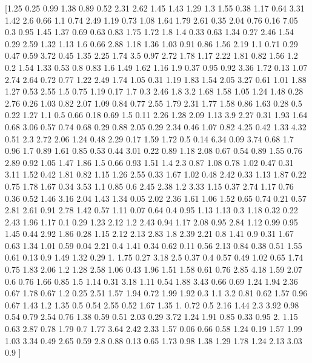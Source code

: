 \documentclass[preview]{standalone}
\begin{document}
\begin{center}
[1.25 0.25 0.99 1.38 0.89 0.52 2.31 2.62 1.45 1.43 1.29 1.3  1.55 0.38
 1.17 0.64 3.31 1.42 2.6  0.66 1.1  0.74 2.49 1.19 0.73 1.08 1.64 1.79
 2.61 0.35 2.04 0.76 0.16 7.05 0.3  0.95 1.45 1.37 0.69 0.63 0.83 1.75
 1.72 1.8  1.4  0.33 0.63 1.34 0.27 2.46 1.54 0.29 2.59 1.32 1.13 1.6
 0.66 2.88 1.18 1.36 1.03 0.91 0.86 1.56 2.19 1.1  0.71 0.29 0.47 0.59
 3.72 0.45 1.35 2.25 1.74 3.5  0.97 2.72 1.78 1.17 2.22 1.81 0.82 1.56
 1.2  0.2  1.54 1.33 0.53 0.8  0.83 1.6  1.49 1.62 1.16 1.9  0.37 0.95
 0.92 3.36 1.72 0.13 1.07 2.74 2.64 0.72 0.77 1.22 2.49 1.74 1.05 0.31
 1.19 1.83 1.54 2.05 3.27 0.61 1.01 1.88 1.27 0.53 2.55 1.5  0.75 1.19
 0.17 1.7  0.3  2.46 1.8  3.2  1.68 1.58 1.05 1.24 1.48 0.28 2.76 0.26
 1.03 0.82 2.07 1.09 0.84 0.77 2.55 1.79 2.31 1.77 1.58 0.86 1.63 0.28
 0.5  0.22 1.27 1.1  0.5  0.66 0.18 0.69 1.5  0.11 2.26 1.28 2.09 1.13
 3.9  2.27 0.31 1.93 1.64 0.68 3.06 0.57 0.74 0.68 0.29 0.88 2.05 0.29
 2.34 0.46 1.07 0.82 4.25 0.42 1.33 4.32 0.51 2.3  2.72 2.06 1.24 0.48
 2.29 0.17 1.59 1.72 0.5  0.14 6.34 0.09 3.74 0.68 1.7  0.96 1.7  0.89
 1.61 0.85 0.53 0.44 3.01 0.22 0.89 1.18 2.08 0.67 0.54 0.89 1.55 0.76
 2.89 0.92 1.05 1.47 1.86 1.5  0.66 0.93 1.51 1.4  2.3  0.87 1.08 0.78
 1.02 0.47 0.31 3.11 1.52 0.42 1.81 0.82 1.15 1.26 2.55 0.33 1.67 1.02
 0.48 2.42 0.33 1.13 1.87 0.22 0.75 1.78 1.67 0.34 3.53 1.1  0.85 0.6
 2.45 2.38 1.2  3.33 1.15 0.37 2.74 1.17 0.76 0.36 0.52 1.46 3.16 2.04
 1.43 1.34 0.05 2.02 2.36 1.61 1.06 1.52 0.65 0.74 0.21 0.57 2.81 2.61
 0.91 2.78 1.42 0.57 1.11 0.07 0.64 0.4  0.95 1.13 1.13 0.3  1.18 0.32
 0.22 2.43 1.96 1.17 0.1  0.29 1.23 2.12 1.2  2.43 0.94 1.17 2.08 0.95
 2.84 1.12 0.99 0.95 1.45 0.44 2.92 1.86 0.28 1.15 2.12 2.13 2.83 1.8
 2.39 2.21 0.8  1.41 0.9  0.31 1.67 0.63 1.34 1.01 0.59 0.04 2.21 0.4
 1.41 0.34 0.62 0.11 0.56 2.13 0.84 0.38 0.51 1.55 0.61 0.13 0.9  1.49
 1.32 0.29 1.   1.75 0.27 3.18 2.5  0.37 0.4  0.57 0.49 1.02 0.65 1.74
 0.75 1.83 2.06 1.2  1.28 2.58 1.06 0.43 1.96 1.51 1.58 0.61 0.76 2.85
 4.18 1.59 2.07 0.6  0.76 1.66 0.85 1.5  1.14 0.31 3.18 1.11 0.54 1.88
 3.43 0.66 0.69 1.24 1.94 2.36 0.67 1.78 0.67 1.2  0.25 2.51 1.57 1.94
 0.72 1.99 1.92 0.3  1.1  3.2  0.81 0.62 1.57 0.96 0.67 1.43 1.2  1.35
 0.5  0.54 2.55 0.52 1.67 1.35 1.   0.72 0.5  2.16 1.44 2.3  3.92 0.98
 0.54 0.79 2.54 0.76 1.38 0.59 0.51 2.03 0.29 3.72 1.24 1.91 0.85 0.33
 0.95 2.   1.15 0.63 2.87 0.78 1.79 0.7  1.77 3.64 2.42 2.33 1.57 0.06
 0.66 0.58 1.24 0.19 1.57 1.99 1.03 3.34 0.49 2.65 0.59 2.8  0.88 0.13
 0.65 1.73 0.98 1.38 1.29 1.78 1.24 2.13 3.03 0.9 ]
\end{center}
\end{document}
